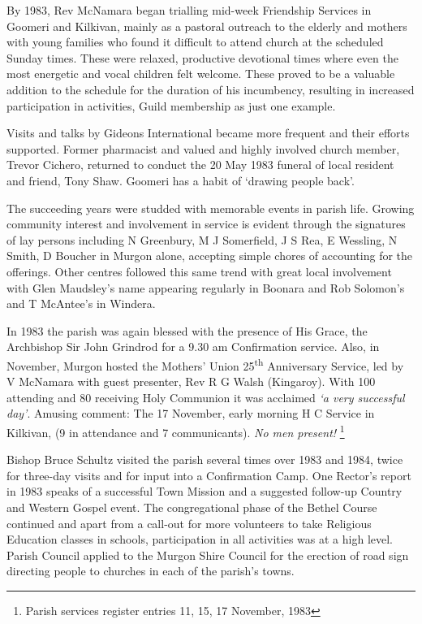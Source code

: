 By 1983, Rev McNamara began trialling mid-week Friendship Services in Goomeri and Kilkivan, mainly as a pastoral outreach to the elderly and mothers with young families who found it difficult to attend church at the scheduled Sunday times. These were relaxed, productive devotional times where even the most energetic and vocal children felt welcome. These proved to be a valuable addition to the schedule for the duration of his incumbency, resulting in increased participation in activities, Guild membership as just one example.



Visits and talks by Gideons International became more frequent and their efforts supported. Former pharmacist and valued and highly involved church member, Trevor Cichero, returned to conduct the 20 May 1983 funeral of local resident and friend, Tony Shaw. Goomeri has a habit of `drawing people back'.



The succeeding years were studded with memorable events in parish life. Growing community interest and involvement in service is evident through the signatures of lay persons including N Greenbury, M J Somerfield, J S Rea, E Wessling, N Smith, D Boucher in Murgon alone, accepting simple chores of accounting for the offerings. Other centres followed this same trend with great local involvement with Glen Maudsley's name appearing regularly in Boonara and Rob Solomon's and T McAntee's in Windera.



In 1983 the parish was again blessed with the presence of His Grace, the Archbishop Sir John Grindrod for a 9.30 am Confirmation service. Also, in November, Murgon hosted the Mothers' Union 25\textsuperscript{th} Anniversary Service, led by V McNamara with guest presenter, Rev R G Walsh (Kingaroy). With 100 attending and 80 receiving Holy Communion it was acclaimed \emph{`a very successful day'}. Amusing comment: The 17 November, early morning H C Service in Kilkivan, (9 in attendance and 7 communicants). \emph{No men present!} \footnote{Parish services register entries 11, 15, 17 November, 1983}


Bishop Bruce Schultz visited the parish several times over 1983 and 1984, twice for three-day visits and for input into a Confirmation Camp. One Rector's report in 1983 speaks of a successful Town Mission and a suggested follow-up Country and Western Gospel event. The congregational phase of the Bethel Course continued and apart from a call-out for more volunteers to take Religious Education classes in schools, participation in all activities was at a high level. Parish Council applied to the Murgon Shire Council for the erection of road sign directing people to churches in each of the parish's towns.



